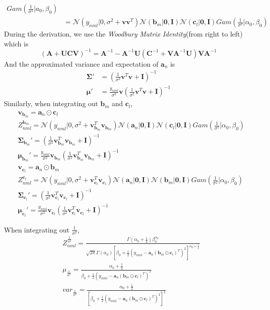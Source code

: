 \documentclass{article}
\newcommand{\bs}[1]{\boldsymbol{#1}}
\newcommand{\gs}[3]{\mathcal{N}(#1|#2,#3)}
\begin{document}
\begin{flushleft}
\begin{equation}
\begin{split}
                 Gam(\frac{1}{\sigma^2} | a_0, \beta_0)\\
	& = \gs{y_{nml}}{0}{\sigma^2 + \bs{v} \bs{v}^T} 
	    \gs{\bs{b}_m}{\bs{0}}{\bs{I}}
        \gs{\bs{c}_l}{\bs{0}}{\bs{I}}
        Gam(\frac{1}{\sigma^2} | \alpha_0, \beta_0)
	\end{split}
\end{equation} 
During the derivation, we use the \textit{Woodbury Matrix Identity}(from right to left) which is
\begin{equation}
	(\bs{A} + \bs{U}\bs{C}\bs{V})^{-1} = \bs{A}^{-1} - \bs{A}^{-1} \bs{U}(\bs{C}^{-1} + \bs{V}\bs{A}^{-1}\bs{U}) \bs{V} \bs{A}^{-1}
\end{equation}
And the approximated variance and expectation of $\bs{a}_n$ is
\begin{align}
	\bs{\Sigma}' & = (\frac{1}{\sigma^2}\bs{v}^T\bs{v} + \bs{I})^{-1} \\
	\bs{\mu}' & = \frac{y_{nml}}{\sigma^2} \bs{v} (\frac{1}{\sigma^2}\bs{v}^T\bs{v} + \bs{I})^{-1}
\end{align}
Similarly, when integrating out $\bs{b}_m$ and $\bs{c}_l$,
\begin{align}
	& \bs{v}_{\bs{b}_m} = \bs{a}_n \odot \bs{c}_l\\
	& Z_{nml}^{\bs{b}_m} = \gs{y_{nml}}{0}{\sigma^2 + \bs{v}_{\bs{b}_m}^T\bs{v}_{\bs{b}_m}}\gs{\bs{a}_n}{\bs{0}}{\bs{I}}\gs{\bs{c}_l}{\bs{0}}{\bs{I}}Gam(\frac{1}{\sigma^2} | \alpha_0, \beta_0)\\
	& \bs{\Sigma}_{\bs{b}_m}'  = (\frac{1}{\sigma^2}\bs{v}_{\bs{b}_m}^T\bs{v}_{\bs{b}_m} + \bs{I})^{-1} \\
	&\bs{\mu}_{\bs{b}_m}'  = \frac{y_{nml}}{\sigma^2} \bs{v}_{\bs{b}_m} (\frac{1}{\sigma^2}\bs{v}_{\bs{b}_m}^T\bs{v}_{\bs{b}_m} + \bs{I})^{-1}\\
	& \bs{v}_{\bs{c}_l} = \bs{a}_n \odot \bs{b}_m\\
	& Z_{nml}^{\bs{c}_l} = \gs{y_{nml}}{0}{\sigma^2 + \bs{v}_{\bs{c}_l}^T\bs{v}_{\bs{c}_l}}\gs{\bs{a}_n}{\bs{0}}{\bs{I}}\gs{\bs{b}_m}{\bs{0}}{\bs{I}}Gam(\frac{1}{\sigma^2} | \alpha_0, \beta_0)\\
	& \bs{\Sigma}_{\bs{c}_l}'  = (\frac{1}{\sigma^2}\bs{v}_{\bs{c}_l}^T\bs{v}_{\bs{c}_l} + \bs{I})^{-1} \\
	&\bs{\mu}_{\bs{c}_l}'  = \frac{y_{nml}}{\sigma^2} \bs{v}_{\bs{c}_l} (\frac{1}{\sigma^2}\bs{v}_{\bs{c}_l}^T\bs{v}_{\bs{c}_l} + \bs{I})^{-1}
\end{align}

When integrating out $\frac{1}{\sigma^2}$,
\begin{align}
	& Z_{nml}^{\frac{1}{\sigma^2}} = \frac{\Gamma(\alpha_0 + \frac{1}{2}) \beta_0^{\alpha_0}}{\sqrt{2\pi} \Gamma(\alpha_0)[\beta_0 + \frac{1}{2}(y_{nml} - \bs{a}_n (\bs{b}_m \odot \bs{c}_l)^T)^2]^{\alpha_0 + \frac{1}{2}}}\\
	& \mu_{\frac{1}{\sigma^2}} = \frac{\alpha_0 + \frac{1}{2}}{\beta_0 + \frac{1}{2}(y_{nml} - \bs{a}_n (\bs{b}_m \odot \bs{c}_l)^T)^2}\\
	& var_{\frac{1}{\sigma^2}} = \frac{\alpha_0 + \frac{1}{2}}{[\beta_0 + \frac{1}{2}(y_{nml} - \bs{a}_n (\bs{b}_m \odot \bs{c}_l)^T)^2]^2}
\end{align}


\end{flushleft}
\end{document}
